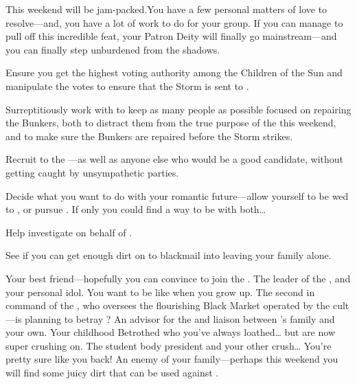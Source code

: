 \documentclass[char]{GL2020}
\begin{document}
This weekend will be jam-packed.You have a few personal matters of love to resolve---and, you have a lot of work to do for your group. If you can manage to pull off this incredible feat, your Patron Deity will finally go mainstream---and you can finally step unburdened from the shadows.
 
\begin{itemz}
	\item Ensure you get the highest voting authority among the Children of the Sun and manipulate the votes to ensure that the Storm is sent to \pSc{}.
	\item Surreptitiously work with \cChupSecond{} to keep as many people as possible focused on repairing the Bunkers, both to distract them from the true purpose of the \pGoaties{} this weekend, and to make sure the Bunkers are repaired before the Storm strikes.
	\item Recruit \cAmbition{} to the \pGoaties{}---as well as anyone else who would be a good candidate, without getting caught by unsympathetic parties.
	\item Decide what you want to do with your romantic future---allow yourself to be wed to \cHeir{}, or pursue \cPresident{}. If only you could find a way to be with both\ldots{}
	\item Help investigate \cChupSecond{} on behalf of \cChupLeader{}.
	\item See if you can get enough dirt on \cEvil{} to blackmail \cEvil{\them} into leaving your family alone.
\end{itemz}
 
\begin{itemz}[Notes]
	\item 
\end{itemz}
 
\begin{contacts}
	\contact{\cAmbition{}} Your best friend---hopefully you can convince \cAmbition{\them} to join the \pGoaties{}.
	\contact{\cChupLeader{}} The leader of the \pGoaties{}, and your personal idol. You want to be like \cChupLeader{\them} when you grow up.
	\contact{\cChupSecond{}} The second in command of the \pGoaties{}, who oversees the flourishing Black Market operated by the cult---is \cChupSecond{} planning to betray \cChupLeader{}?
	\contact{\cDiplomat{}} An advisor for the \pTech{} and liaison between \cHeir{}'s family and your own.
	\contact{\cHeir{}} Your childhood Betrothed who you've always loathed\ldots{} but are now super crushing on.
	\contact{\cPresident{}} The student body president and your other crush\ldots{} You're pretty sure  like you back!
	\contact{\cEvil{}} An enemy of your family---perhaps this weekend you will find some juicy dirt that can be used against \cEvil{\them}.

\end{contacts}
 
\end{document}
